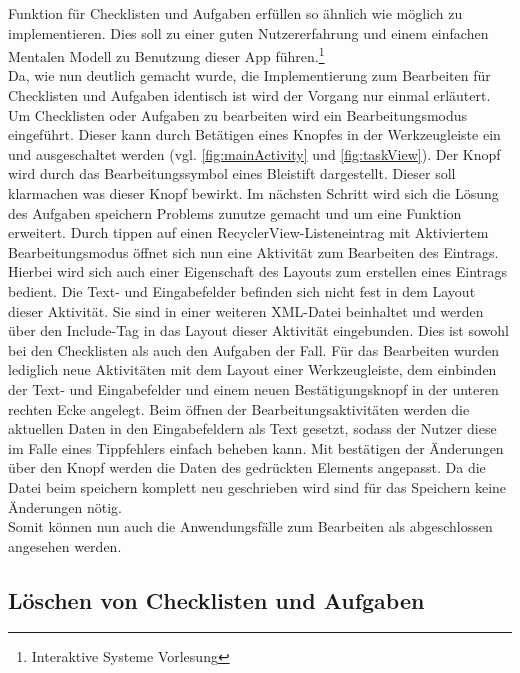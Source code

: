 Funktion für Checklisten und Aufgaben erfüllen so ähnlich wie möglich zu implementieren. Dies soll zu einer guten Nutzererfahrung und einem einfachen Mentalen Modell zu Benutzung dieser App führen.\footnote{Interaktive Systeme Vorlesung}\\
Da, wie nun deutlich gemacht wurde, die Implementierung zum Bearbeiten für Checklisten und Aufgaben identisch ist wird der Vorgang nur einmal erläutert. Um Checklisten oder Aufgaben zu bearbeiten wird ein Bearbeitungsmodus eingeführt. Dieser kann durch Betätigen eines Knopfes in der Werkzeugleiste ein und ausgeschaltet werden (vgl. \autoref{fig:mainActivity} und \autoref{fig:taskView}). Der Knopf wird durch das Bearbeitungssymbol eines Bleistift dargestellt. Dieser soll klarmachen was dieser Knopf bewirkt. Im nächsten Schritt wird sich die Lösung des Aufgaben speichern Problems zunutze gemacht und um eine Funktion erweitert. Durch tippen auf einen RecyclerView-Listeneintrag mit Aktiviertem Bearbeitungsmodus öffnet sich nun eine Aktivität zum Bearbeiten des Eintrags. Hierbei wird sich auch einer Eigenschaft des Layouts zum erstellen eines Eintrags bedient. Die Text- und Eingabefelder befinden sich nicht fest in dem Layout dieser Aktivität. Sie sind in einer weiteren XML-Datei beinhaltet und werden über den Include-Tag in das Layout dieser Aktivität eingebunden. Dies ist sowohl bei den Checklisten als auch den Aufgaben der Fall. Für das Bearbeiten wurden lediglich neue Aktivitäten mit dem Layout einer Werkzeugleiste, dem einbinden der Text- und Eingabefelder und einem neuen Bestätigungsknopf in der unteren rechten Ecke angelegt. Beim öffnen der Bearbeitungsaktivitäten werden die aktuellen Daten in den Eingabefeldern als Text gesetzt, sodass der Nutzer diese \zB im Falle eines Tippfehlers einfach beheben kann. Mit bestätigen der Änderungen über den Knopf werden die Daten des gedrückten Elements angepasst. Da die Datei beim speichern komplett neu geschrieben wird sind für das Speichern keine Änderungen nötig.\\
Somit können nun auch die Anwendungsfälle zum Bearbeiten als abgeschlossen angesehen werden.

\subsection{Löschen von Checklisten und Aufgaben}\label{subsec:löschen}

